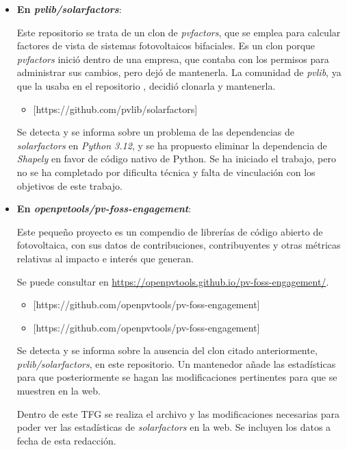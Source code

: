 \begin{itemize}

    \item \textbf{En \textit{pvlib/solarfactors}}:

          Este repositorio se trata de un clon de \textit{pvfactors}, que se emplea para calcular factores de vista de sistemas fotovoltaicos bifaciales. Es un clon porque \textit{pvfactors} inició dentro de una empresa, que contaba con los permisos para administrar sus cambios, pero dejó de mantenerla. La comunidad de \textit{pvlib}, ya que la usaba en el repositorio \pvlibpy, decidió clonarla y mantenerla.

          \begin{itemize}
              \item {}[https://github.com/pvlib/solarfactors]
          \end{itemize}

          Se detecta y se informa sobre un problema de las dependencias de \textit{solarfactors} en \textit{Python 3.12}, y se ha propuesto eliminar la dependencia de \textit{Shapely} en favor de código nativo de Python. Se ha iniciado el trabajo, pero no se ha completado por dificulta técnica y falta de vinculación con los objetivos de este trabajo.

    \item \textbf{En \textit{openpvtools/pv-foss-engagement}}:

          Este pequeño proyecto es un compendio de librerías de código abierto de fotovoltaica, con sus datos de contribuciones, contribuyentes y otras métricas relativas al impacto e interés que generan.

          Se puede consultar en \url{https://openpvtools.github.io/pv-foss-engagement/}.

          \begin{itemize}
              \item {}[https://github.com/openpvtools/pv-foss-engagement]
              \item {}[https://github.com/openpvtools/pv-foss-engagement]
          \end{itemize}

          Se detecta y se informa sobre la ausencia del clon citado anteriormente, \textit{pvlib/solarfactors}, en este repositorio. Un mantenedor añade las estadísticas para que posteriormente se hagan las modificaciones pertinentes para que se muestren en la web.

          Dentro de este TFG se realiza el archivo y las modificaciones necesarias para poder ver las estadísticas de \textit{solarfactors} en la web. Se incluyen los datos a fecha de esta redacción.

\end{itemize}

